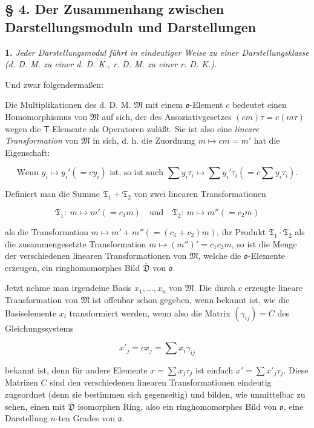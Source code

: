 \subsection*{§ 4. Der Zusammenhang zwischen Darstellungsmoduln und Darstellungen}\label{der-zusammenhang-zwischen-darstellungsmoduln-und-darstellungen}

\textbf{1.} \emph{Jeder Darstellungsmodul führt in eindeutiger Weise zu einer Darstellungsklasse (d. D. M. zu einer d. D. K., r. D. M. zu einer r. D. K.).}

Und zwar folgendermaßen:

Die Multiplikationen des d. D. M. \(\mathfrak M\) mit einem \(\mathfrak{o}\)-Element \(c\) bedeutet einen Homomorphismus von \(\mathfrak M\) auf sich, der des Assoziativgesetzes \((cm)\tau=c(m\tau)\) wegen die \(\mathsf T\)-Elemente als Operatoren zuläßt. Sie ist also eine \emph{lineare Transformation} von \(\mathfrak M\) in sich, d. h. die Zuordnung \(m\mapsto cm=m'\) hat die Eigenschaft:

\[
\text{Wenn } y_i\mapsto y_i'(=cy_i) \text{ ist, so ist auch }
\sum y_i\tau_i\mapsto \sum y_i'\tau_i\left(=c\sum y_i\tau_i\right).
\]

Definiert man die Summe \(\mathfrak T_1+\mathfrak T_2\) von zwei linearen Transformationen

\[
\mathfrak T_1:\ m\mapsto m'(=c_1m)
\quad\text{und}\quad
\mathfrak T_2:\ m\mapsto m''(=c_2m)
\]

als die Transformation \(m\mapsto m'+m''(=(c_1+c_2)m)\), ihr Produkt \(\mathfrak T_1\cdot\mathfrak T_2\) als die zusammengesetzte Transformation \(m\mapsto (m'')'=c_1c_2m\), so ist die Menge der verschiedenen linearen Transformationen von \(\mathfrak M\), welche die \(\mathfrak{o}\)-Elemente erzeugen, ein ringhomomorphes Bild \(\overline{\mathfrak D}\) von \(\mathfrak{o}\).

Jetzt nehme man irgendeine Basis \(x_1,\ldots,x_n\) von \(\mathfrak M\). Die durch \(c\) erzeugte lineare Transformation von \(\mathfrak M\) ist offenbar schon gegeben, wenn bekannt ist, wie die Basiselemente \(x_i\) transformiert werden, wenn also die Matrix \((\gamma_{ij})=C\) des Gleichungssystems

\[
x'_j=cx_j=\sum x_i\gamma_{ij}
\]

bekannt ist, denn für andere Elemente \(x=\sum x_j\tau_j\) ist einfach \(x'=\sum x'_j\tau_j\). Diese Matrizen \(C\) sind den verschiedenen linearen Transformationen eindeutig zugeordnet (denn sie bestimmen sich gegenseitig) und bilden, wie unmittelbar zu sehen, einen mit \(\overline{\mathfrak D}\) isomorphen Ring, also ein ringhomomorphes Bild von \(\mathfrak{o}\), eine Darstellung \(n\)-ten Grades von \(\mathfrak{o}\).
